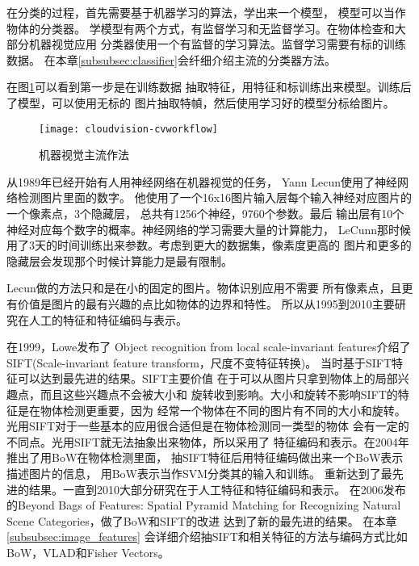 在分类的过程，首先需要基于机器学习的算法，学出来一个模型，
模型可以当作物体的分类器。
学模型有两个方式，有监督学习和无监督学习。在物体检查和大部分机器视觉应用
分类器使用一个有监督的学习算法。监督学习需要有标的训练数据。
在本章\ref{subsubsec:classifier}会纤细介绍主流的分类器方法。

在图\ref{fig:cloudvision-cvworkflow}可以看到第一步是在训练数据
抽取特征，用特征和标训练出来模型。训练后了模型，可以使用无标的
图片抽取特幀，然后使用学习好的模型分标给图片。
\begin{figure}[H]
  \centering
    \texttt{[image: cloudvision-cvworkflow]}
  \caption{机器视觉主流作法}
  \label{fig:cloudvision-cvworkflow}
\end{figure}

从1989年已经开始有人用神经网络在机器视觉的任务，
Yann Lecun使用了神经网络检测图片里面的数字。\cite{lecun1989backpropagation}
他使用了一个16x16图片输入层每个输入神经对应图片的一个像素点，3个隐藏层，
总共有1256个神经，9760个参数。最后
输出层有10个神经对应每个数字的概率。神经网络的学习需要大量的计算能力，
LeCunn那时候用了3天的时间训练出来参数。考虑到更大的数据集，像素度更高的
图片和更多的隐藏层会发现那个时候计算能力是最有限制。

Lecun做的方法只和是在小的固定的图片。物体识别应用不需要
所有像素点，且更有价值是图片的最有兴趣的点比如物体的边界和特性。
所以从1995到2010主要研究在人工的特征和特征编码与表示。

在1999，Lowe发布了
Object recognition from local scale-invariant features介绍了
SIFT(Scale-invariant feature transform，尺度不变特征转换)。\cite{lowe1999object,lowe2004distinctive}
当时基于SIFT特征可以达到最先进的结果。SIFT主要价值
在于可以从图片只拿到物体上的局部兴趣点，而且这些兴趣点不会被大小和
旋转收到影响。大小和旋转不影响SIFT的特征是在物体检测更重要，因为
经常一个物体在不同的图片有不同的大小和旋转。
光用SIFT对于一些基本的应用很合适但是在物体检测同一类型的物体
会有一定的不同点。光用SIFT就无法抽象出来物体，所以采用了
特征编码和表示。在2004年推出了用BoW在物体检测里面，
抽SIFT特征后用特征编码做出来一个BoW表示描述图片的信息，
用BoW表示当作SVM分类其的输入和训练。\cite{csurka2004visual}
重新达到了最先进的结果。一直到2010大部分研究在于人工特征和特征编码和表示。
在2006发布的Beyond Bags of Features: Spatial Pyramid Matching
for Recognizing Natural Scene Categories，做了BoW和SIFT的改进
达到了新的最先进的结果。 \cite{lazebnik2006beyond}
在本章\ref{subsubsec:image_features}
会详细介绍抽SIFT和相关特征的方法与编码方式比如BoW，VLAD和Fisher Vectors。

